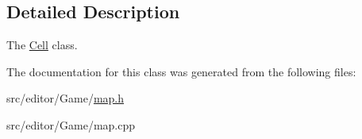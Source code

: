 \subsection{\-Detailed \-Description}
\-The \hyperlink{class_cell}{\-Cell} class. 

\-The documentation for this class was generated from the following files\-:\begin{DoxyCompactItemize}
\item 
src/editor/\-Game/\hyperlink{map_8h}{map.\-h}\item 
src/editor/\-Game/map.\-cpp\end{DoxyCompactItemize}
